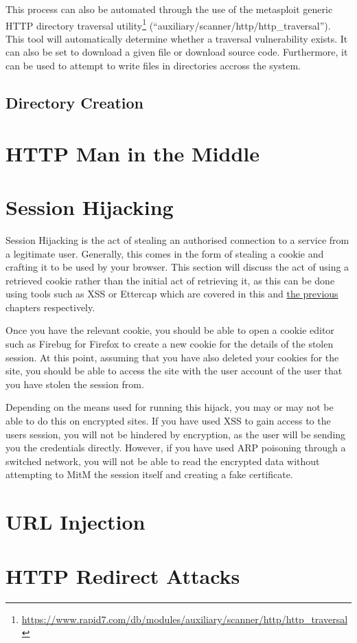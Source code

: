 		This process can also be automated through the use of the metasploit generic HTTP directory traversal 
		utility\footnote{\url{https://www.rapid7.com/db/modules/auxiliary/scanner/http/http_traversal}} 
		(``auxiliary/scanner/http/http\_traversal'').
		This tool will automatically determine whether a traversal vulnerability exists. 
		It can also be set to download a given file or download source code. 
		Furthermore, it can be used to attempt to write files in directories accross the system. 
		\subsection{Directory Creation}
	\section{HTTP Man in the Middle}
	\section{Session Hijacking}
		Session Hijacking is the act of stealing an authorised connection to a service from a legitimate user. 
		Generally, this comes in the form of stealing a cookie and crafting it to be used by your browser. 
		This section will discuss the act of using a retrieved cookie rather than the initial act of retrieving it, 
		as this can be done using tools such as XSS or Ettercap which are covered in this and \href{ch:NetworkPenetration}{the previous} chapters respectively. 

		Once you have the relevant cookie, you should be able to open a cookie editor such as Firebug for Firefox to create a new cookie for the details of the stolen session. 
		At this point, assuming that you have also deleted your cookies for the site, you should be able to access the site with the user account of the user that you have stolen the session from. 

		Depending on the means used for running this hijack, you may or may not be able to do this on encrypted sites.
		If you have used XSS to gain access to the users session, you will not be hindered by encryption, as the user will be sending you the credentials directly. 
		However, if you have used ARP poisoning through a switched network, you will not be able to read the encrypted data without attempting to MitM the session itself and creating a fake certificate. 
	\section{URL Injection}
	\section{HTTP Redirect Attacks}
